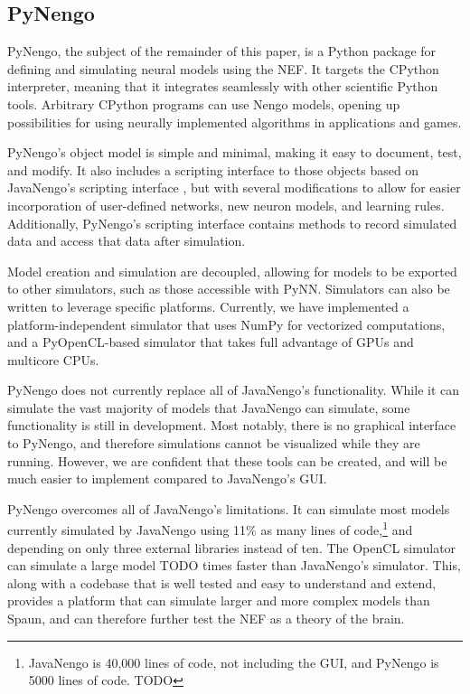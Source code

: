\documentclass{frontiersSCNS}
\begin{document}
\subsection{PyNengo}

PyNengo,
the subject of the remainder of this paper,
is a Python package for
defining and simulating
neural models using the NEF.
It targets the CPython interpreter,
meaning that it integrates seamlessly
with other scientific Python tools.
Arbitrary CPython programs
can use Nengo models,
opening up possibilities
for using neurally implemented algorithms
in applications and games.

PyNengo's object model is simple and minimal,
making it easy to
document, test, and modify.
It also includes a scripting interface to those objects
based on JavaNengo's scripting interface \cite{TODO},
but with several modifications
to allow for easier incorporation
of user-defined networks,
new neuron models, and learning rules.
Additionally, PyNengo's scripting interface
contains methods to record simulated data
and access that data after simulation.

Model creation and simulation are decoupled,
allowing for models to be exported
to other simulators,
such as those accessible with PyNN.
Simulators can also be written
to leverage specific platforms.
Currently, we have implemented
a platform-independent simulator
that uses NumPy for vectorized computations,
and a PyOpenCL-based
simulator that takes full advantage of GPUs
and multicore CPUs.

PyNengo does not currently
replace all of JavaNengo's functionality.
While it can simulate the vast majority
of models that JavaNengo can simulate,
some functionality is still in development.
Most notably, there is no graphical interface
to PyNengo, and therefore simulations
cannot be visualized while they are running.
However, we are confident that these tools
can be created, and will be much easier
to implement compared to JavaNengo's GUI.

PyNengo overcomes all of JavaNengo's limitations.
It can simulate most models
currently simulated by JavaNengo
using 11\% as many lines of code,\footnote{
  JavaNengo is 40,000 lines of code, not including the GUI,
  and PyNengo is 5000 lines of code. TODO}
and depending on
only three external libraries instead of ten.
The OpenCL simulator can simulate
a large model TODO times
faster than JavaNengo's simulator.
This, along with a codebase
that is well tested and
easy to understand and extend,
provides a platform
that can simulate larger and more complex
models than Spaun,
and can therefore further
test the NEF as a theory of the brain.
\end{document}
